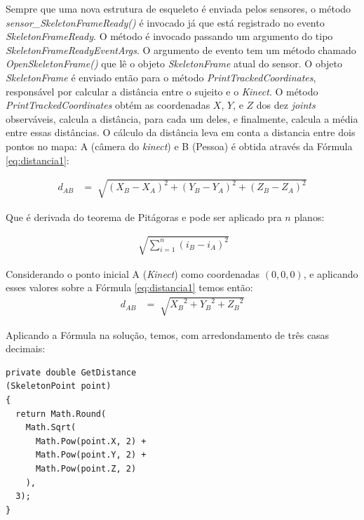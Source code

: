 Sempre que uma nova estrutura de esqueleto é enviada pelos sensores, o método \textit{sensor\_SkeletonFrameReady()} é invocado já que está registrado no evento \textit{SkeletonFrameReady}. O método é invocado passando um argumento do tipo \textit{SkeletonFrameReadyEventArgs}. O argumento de evento tem um método chamado \textit{OpenSkeletonFrame()} que lê o objeto \textit{SkeletonFrame} atual do sensor. O objeto \textit{SkeletonFrame} é enviado então para o método \textit{PrintTrackedCoordinates}, responsável por calcular a distância entre o sujeito e o \textit{Kinect}. O método \textit{PrintTrackedCoordinates} obtém as coordenadas $X$, $Y$, e $Z$ dos dez \textit{joints} observáveis, calcula a distância, para cada um deles, e finalmente, calcula a média entre essas distâncias. O cálculo da distância leva em conta a distancia entre dois pontos no mapa: A (câmera do \textit{kinect}) e B (Pessoa) é obtida através da Fórmula \ref{eq:distancia1}:

\begin{align}
    d_{AB} &= \sqrt[]{{(X_{B} - X_{A})}^2 + {(Y_{B} - Y_{A})}^2 + {(Z_{B} - Z_{A})}^2}
    \label{eq:distancia1}
\end{align}

Que é derivada do teorema de Pitágoras e pode ser aplicado pra $n$ planos:

\begin{align}
    \sqrt[]{\sum_{i=1}^{n}{(i_{B} - i_{A})}^2}
    \label{eq:pitagoras}
\end{align}


Considerando o ponto inicial A (\textit{Kinect}) como coordenadas $(0,0,0)$, e aplicando esses valores sobre a Fórmula   \ref{eq:distancia1} temos então:
\begin{align}
    d_{AB} &= \sqrt[]{{X_{B}}^2 + {Y_{B}}^2 + {Z_{B}}^2} 
    \label{eq:distanciaFinal}
\end{align}


Aplicando a Fórmula na solução, temos, com arredondamento de três casas decimais:
\begin{verbatim}
private double GetDistance
(SkeletonPoint point)
{
  return Math.Round(
    Math.Sqrt(
      Math.Pow(point.X, 2) +
      Math.Pow(point.Y, 2) +
      Math.Pow(point.Z, 2)
    ), 
  3);
}
\end{verbatim}

